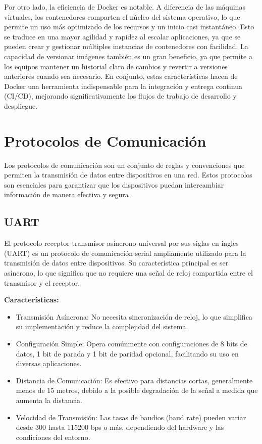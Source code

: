 Por otro lado, la eficiencia de Docker es notable. A diferencia de las máquinas virtuales, los contenedores comparten el núcleo del sistema operativo, lo que permite un uso más optimizado de los recursos y un inicio casi instantáneo. Esto se traduce en una mayor agilidad y rapidez al escalar aplicaciones, ya que se pueden crear y gestionar múltiples instancias de contenedores con facilidad. La capacidad de versionar imágenes también es un gran beneficio, ya que permite a los equipos mantener un historial claro de cambios y revertir a versiones anteriores cuando sea necesario. En conjunto, estas características hacen de Docker una herramienta indispensable para la integración y entrega continua (CI/CD), mejorando significativamente los flujos de trabajo de desarrollo y despliegue.

\section{Protocolos de Comunicación}\label{sec:protocolos_de_comunicacion}

Los protocolos de comunicación son un conjunto de reglas y convenciones que permiten la transmisión de datos entre dispositivos en una red. Estos protocolos son esenciales para garantizar que los dispositivos puedan intercambiar información de manera efectiva y segura \cite{Eterovic2018AnlisisDP}.

\subsection{UART}

El protocolo receptor-transmisor asíncrono universal por sus siglas en ingles (UART) es un protocolo de comunicación serial ampliamente utilizado para la transmisión de datos entre dispositivos. Su característica principal es ser asíncrono, lo que significa que no requiere una señal de reloj compartida entre el transmisor y el receptor.

\textbf{Características:}

\begin{itemize}
    \item Transmisión Asíncrona: No necesita sincronización de reloj, lo que simplifica su implementación y reduce la complejidad del sistema.
    \item Configuración Simple: Opera comúnmente con configuraciones de 8 bits de datos, 1 bit de parada y 1 bit de paridad opcional, facilitando su uso en diversas aplicaciones.
    \item Distancia de Comunicación: Es efectivo para distancias cortas, generalmente menos de 15 metros, debido a la posible degradación de la señal a medida que aumenta la distancia.
    \item Velocidad de Transmisión: Las tasas de baudios (baud rate) pueden variar desde 300 hasta 115200 bps o más, dependiendo del hardware y las condiciones del entorno.
\end{itemize}


